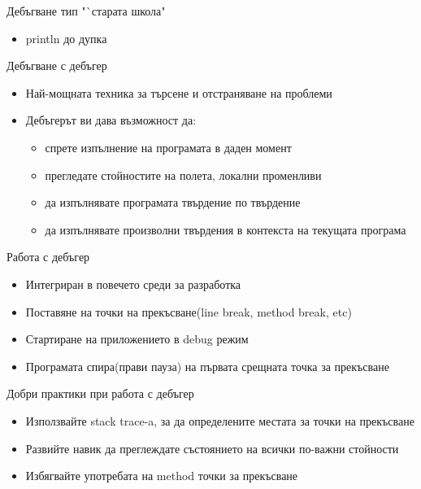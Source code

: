 \documentclass{beamer}
\begin{document}
\begin{frame}{Дебъгване тип "`старата школа"}
  \transdissolve
  \begin{itemize}
  \item println до дупка
  \end{itemize}
\end{frame}

\begin{frame}{Дебъгване с дебъгер}
  \transdissolve
  \begin{itemize}
  \item Най-мощната техника за търсене и отстраняване на проблеми \pause
  \item Дебъгерът ви дава възможност да:
    \begin{itemize}
      \item спрете изпълнение на програмата в даден момент \pause
      \item прегледате стойностите на полета, локални променливи \pause
      \item да изпълнявате програмата твърдение по твърдение \pause
      \item да изпълнявате произволни твърдения в контекста на
        текущата програма 
    \end{itemize}

  \end{itemize}
\end{frame}

\begin{frame}{Работа с дебъгер}
  \transdissolve
  \begin{itemize}
  \item Интегриран в повечето среди за разработка \pause
  \item Поставяне на точки на прекъсване(line break, method break,
    etc) \pause
  \item Стартиране на приложението в debug режим \pause
  \item Програмата спира(прави пауза) на първата срещната точка за
    прекъсване
  \end{itemize}
\end{frame}

\begin{frame}{Добри практики при работа с дебъгер}
  \transdissolve
  \begin{itemize}
  \item Използвайте stack trace-a, за да определените местата за точки
    на прекъсване \pause
  \item Развийте навик да преглеждате състоянието на всички по-важни
    стойности \pause
  \item Избягвайте употребата на method точки за прекъсване
  \end{itemize}
\end{frame}
\end{document}
